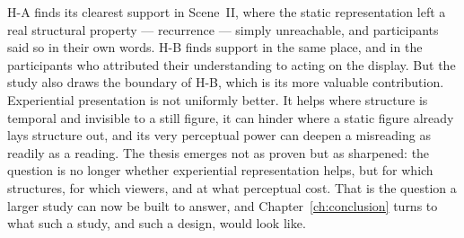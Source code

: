 H-A finds its clearest support in Scene~II, where the static representation left a real structural property --- recurrence --- simply unreachable, and participants said so in their own words. H-B finds support in the same place, and in the participants who attributed their understanding to acting on the display. But the study also draws the boundary of H-B, which is its more valuable contribution. Experiential presentation is not uniformly better. It helps where structure is temporal and invisible to a still figure, it can hinder where a static figure already lays structure out, and its very perceptual power can deepen a misreading as readily as a reading. The thesis emerges not as proven but as sharpened: the question is no longer whether experiential representation helps, but for which structures, for which viewers, and at what perceptual cost. That is the question a larger study can now be built to answer, and Chapter~\ref{ch:conclusion} turns to what such a study, and such a design, would look like.